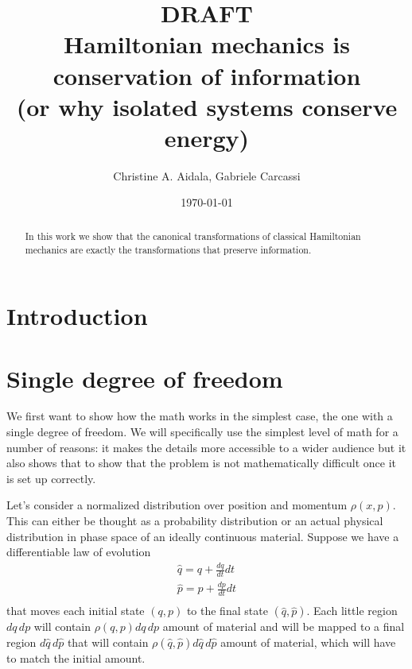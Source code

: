 \documentclass[aps,pra,10pt,twocolumn,floatfix,nofootinbib]{revtex4-1}
\begin{document}
\title{DRAFT \\ Hamiltonian mechanics is conservation of information \\ (or why isolated systems conserve energy)}
\author{Christine A. Aidala, Gabriele Carcassi}



\date{\today}

\begin{abstract}
In this work we show that the canonical transformations of classical Hamiltonian mechanics are exactly the transformations that preserve information.
\end{abstract}

\maketitle

\section{Introduction}

\section{Single degree of freedom}

We first want to show how the math works in the simplest case, the one with a single degree of freedom. We will specifically use the simplest level of math for a number of reasons: it makes the details more accessible to a wider audience but it also shows that to show that the problem is not mathematically difficult once it is set up correctly.

Let's consider a normalized distribution over position and momentum $\rho(x, p)$. This can either be thought as a probability distribution or an actual physical distribution in phase space of an ideally continuous material. Suppose we have a differentiable law of evolution
\begin{equation}
\label{newCoordinates}
\begin{aligned}
\hat{q} = q + \frac{dq}{dt} dt  \\
\hat{p} = p + \frac{dp}{dt} dt  \\
\end{aligned}
\end{equation}
that moves each initial state $(q,p)$ to the final state $(\hat{q},\hat{p})$. Each little region $dq \,dp$ will contain $\rho(q, p) dq \,dp$ amount of material and will be mapped to a final region $d\hat{q} \,d\hat{p}$ that will contain $\rho(\hat{q}, \hat{p}) d\hat{q} \,d\hat{p}$ amount of material, which will have to match the initial amount.
\end{document}
